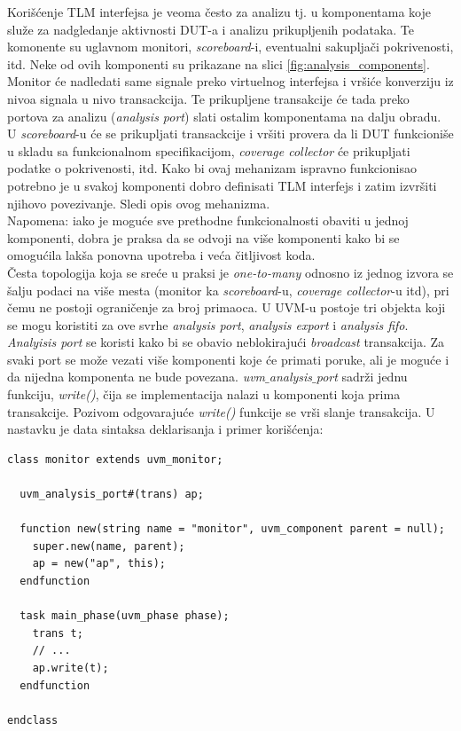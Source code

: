 Korišćenje TLM interfejsa je veoma često za analizu tj. u komponentama koje
služe za nadgledanje aktivnosti DUT-a i analizu prikupljenih podataka. Te
komonente su uglavnom monitori, \emph{scoreboard}-i, eventualni sakupljači
pokrivenosti, itd. Neke od ovih komponenti su prikazane na slici
\ref{fig:analysis_components}. Monitor će nadledati same signale preko
virtuelnog interfejsa i vršiće konverziju iz nivoa signala u nivo transackcija.
Te prikupljene transakcije će tada preko portova za analizu (\emph{analysis
  port}) slati ostalim komponentama na dalju obradu. U \emph{scoreboard}-u će se
prikupljati transackcije i vršiti provera da li DUT funkcioniše u skladu sa
funkcionalnom specifikacijom, \emph{coverage collector} će prikupljati podatke o
pokrivenosti, itd. Kako bi ovaj mehanizam ispravno funkcionisao potrebno je u
svakoj komponenti dobro definisati TLM interfejs i zatim izvršiti njihovo
povezivanje. Sledi opis ovog mehanizma.\\

Napomena: iako je moguće sve prethodne funkcionalnosti obaviti u jednoj
komponenti, dobra je praksa da se odvoji na više komponenti kako bi se omogućila
lakša ponovna upotreba i veća čitljivost koda.\\

Česta topologija koja se sreće u praksi je \emph{one-to-many} odnosno iz jednog
izvora se šalju podaci na više mesta (monitor ka \emph{scoreboard}-u,
\emph{coverage collector}-u itd), pri čemu ne postoji ograničenje za broj
primaoca. U UVM-u postoje tri objekta koji se mogu koristiti za ove svrhe
\emph{analysis port}, \emph{analysis export} i \emph{analysis fifo}.\\

\emph{Analyisis port} se koristi kako bi se obavio neblokirajući
\emph{broadcast} transakcija. Za svaki port se može vezati više komponenti koje
će primati poruke, ali je moguće i da nijedna komponenta ne bude povezana.
\emph{uvm\(\_\)analysis\(\_\)port} sadrži jednu funkciju, \emph{write()}, čija
se implementacija nalazi u komponenti koja prima transakcije. Pozivom
odgovarajuće \emph{write()} funkcije se vrši slanje transakcija. U nastavku je
data sintaksa deklarisanja i primer korišćenja:

\begin{lstlisting}
class monitor extends uvm_monitor;

  uvm_analysis_port#(trans) ap;

  function new(string name = "monitor", uvm_component parent = null);
    super.new(name, parent);
    ap = new("ap", this);
  endfunction

  task main_phase(uvm_phase phase);
    trans t;
    // ...
    ap.write(t);
  endfunction

endclass
\end{lstlisting}

